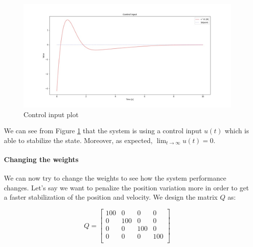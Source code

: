 \begin{figure}[h!]
    \centering
    \includegraphics[width=\textwidth]{images/1-pendulum_input.jpg}
    \caption{Control input plot}
    \label{fig:cartpole_input}
\end{figure}

We can see from Figure \ref{fig:cartpole_input} that the system is using a control input $u(t)$ which is able to stabilize the state. Moreover, as expected, $\lim_{t \to \infty} u(t) = 0$.

\paragraph{Changing the weights}
We can now try to change the weights to see how the system performance changes. Let's say we want to penalize the position variation more in order to get a faster stabilization of the position and velocity. We design the matrix $Q$ as: 

\begin{equation}
    Q = \begin{bmatrix}
         100 & 0 & 0 &  0\\
         0 & 100 & 0 & 0\\
         0 & 0 & 100 & 0\\
         0 & 0 & 0 & 100\\
    \end{bmatrix}
\end{equation}

